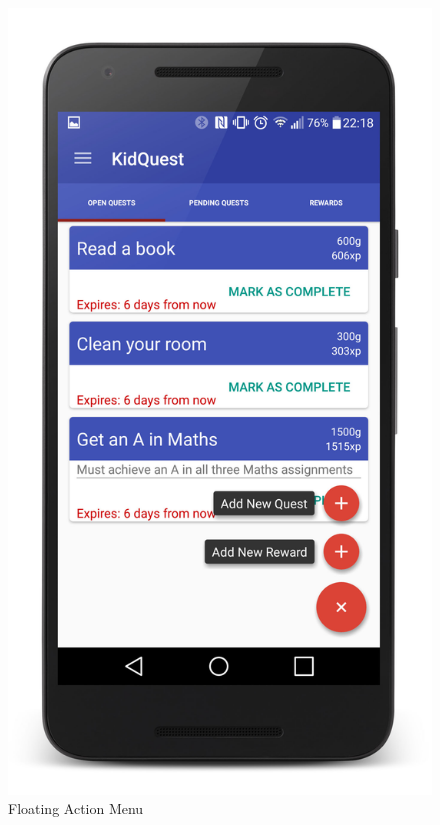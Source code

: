 \begin{figure}[ht] 
  \begin{minipage}[b]{0.45\linewidth}
    \centering
    \includegraphics[width=.8\linewidth]{../images/Screenshot/FabMenu.jpg} 
    \caption{Floating Action Menu} 
    \vspace{4ex}
  \end{minipage}%
  \begin{minipage}[b]{0.45\linewidth}
    \centering    

\end{minipage}
\end{figure}
